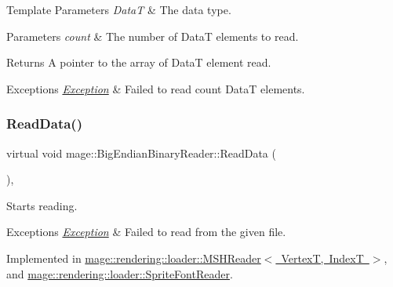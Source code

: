 \begin{DoxyTemplParams}{Template Parameters}
{\em DataT} & The data type. \\
\hline
\end{DoxyTemplParams}

\begin{DoxyParams}{Parameters}
{\em count} & The number of {\ttfamily DataT} elements to read. \\
\hline
\end{DoxyParams}
\begin{DoxyReturn}{Returns}
A pointer to the array of {\ttfamily DataT} element read. 
\end{DoxyReturn}

\begin{DoxyExceptions}{Exceptions}
{\em \mbox{\hyperlink{classmage_1_1_exception}{Exception}}} & Failed to read {\ttfamily count} {\ttfamily DataT} elements. \\
\hline
\end{DoxyExceptions}
\mbox{\label{classmage_1_1_big_endian_binary_reader_a7dc0689d598fa91308597b129516a11d}} 
\subsubsection{\texorpdfstring{Read\+Data()}{ReadData()}}
{\footnotesize\ttfamily virtual void mage\+::\+Big\+Endian\+Binary\+Reader\+::\+Read\+Data (\begin{DoxyParamCaption}{ }\end{DoxyParamCaption})\hspace{0.3cm}{\ttfamily [private]}, {}}

Starts reading.


\begin{DoxyExceptions}{Exceptions}
{\em \mbox{\hyperlink{classmage_1_1_exception}{Exception}}} & Failed to read from the given file. \\
\hline
\end{DoxyExceptions}


Implemented in \mbox{\hyperlink{classmage_1_1rendering_1_1loader_1_1_m_s_h_reader_a99e8e3c50decb9332dc10bcdf7b6e00a}{mage\+::rendering\+::loader\+::\+M\+S\+H\+Reader$<$ Vertex\+T, Index\+T $>$}}, and \mbox{\hyperlink{classmage_1_1rendering_1_1loader_1_1_sprite_font_reader_ae5b827dade3bd800e2000788efa91e30}{mage\+::rendering\+::loader\+::\+Sprite\+Font\+Reader}}.

